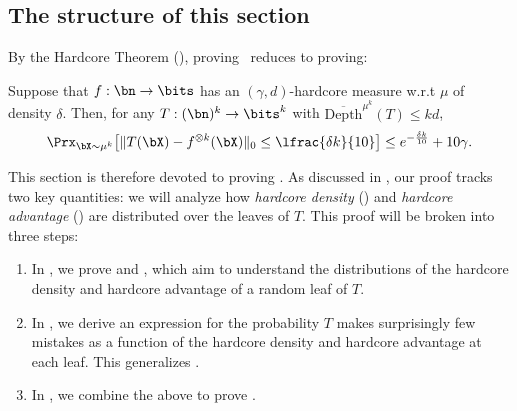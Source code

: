 \documentclass[11pt]{article}
\newcommand{\odepthmu}{\overline{\mathrm{Depth}}^\mu}
\newcommand{\odepthmuk}{\overline{\mathrm{Depth}}^{\mu^k}}
\DeclarePairedDelimiter\lzero{\|}{\|_0}
\DeclarePairedDelimiter\bracket{[}{]}
\begin{document}
\subsection{The structure of this section}

By the Hardcore Theorem (), proving~ reduces to proving:  \medskip 

\begin{tcolorbox}[colback = white,arc=1mm, boxrule=0.25mm]
\begin{theorem}
    \label{thm:bounds-from-hardcore}
    Suppose that $f:\bn \to \bits$ has an $(\gamma, d)$-hardcore measure w.r.t $\mu$ of density $\delta$. Then, for any $T:(\bn)^k \to \bits^k$ with $\odepthmuk(T) \leq kd$,%
    \begin{equation*}
        \Prx_{\bX \sim \mu^k}\bracket*{\lzero{T(\bX) - f^{\otimes k}(\bX)} \leq \lfrac{\delta k}{10}} \leq e^{-\frac{\delta k}{10}} + 10\gamma.
    \end{equation*}
\end{theorem}
\end{tcolorbox}
\medskip 

This section is therefore devoted to proving .  As discussed in , our proof tracks two key quantities: we will analyze how {\sl hardcore density} () and {\sl hardcore advantage} () are distributed over the leaves of $T$. This proof will be broken into three steps:
\begin{enumerate}
    \item In , we prove  and , which aim to understand the distributions of the hardcore density and hardcore advantage of a random leaf of $T$.
    \item In , we derive an expression for the probability $T$ makes surprisingly few mistakes as a function of the hardcore density and hardcore advantage at each leaf. This generalizes .
    \item In , we combine the above  to prove .
\end{enumerate}
\end{document}
